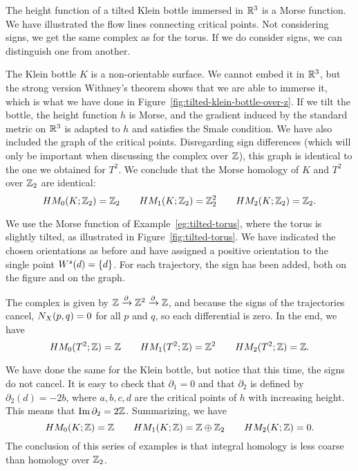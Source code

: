 \begin{eg}
    \begin{marginfigure}
        \centering
        \caption{The height function of a tilted Klein bottle immersed in $\R^3$ is a Morse function.
            We have illustrated the flow lines connecting critical points.
            Not considering signs, we get the same complex as for the torus. If we do consider signs, we can distinguish one from another.
        }
        \label{fig:tilted-klein-bottle-over-z}
    \end{marginfigure}
    The Klein bottle $K$ is a non-orientable surface. We cannot embed it in $\R^3$, but the strong version Withney's theorem shows that we are able to immerse it, which is what we have done in Figure~\ref{fig:tilted-klein-bottle-over-z}.
    If we tilt the bottle, the height function $h$ is Morse, and the gradient induced by the standard metric on $\R^3$ is adapted to $h$ and satisfies the Smale condition.
    We have also included the graph of the critical points.
    Disregarding sign differences (which will only be important when discussing the complex over $\Z$), this graph is identical to the one we obtained for $T^2$. We conclude that the Morse homology of $K$ and  $T^2$ over $\Z_2$ are identical:
    \[
        \HMf[0]{K; \Z_2} = \Z_2 \qquad
        \HMf[1]{K; \Z_2} = \Z_2^2 \qquad
        \HMf[2]{K; \Z_2} = \Z_2
    .\] 
\end{eg}

\begin{eg}
    We use the Morse function of Example~\ref{eg:tilted-torus}, where the torus is slightly tilted, as illustrated in Figure~\ref{fig:tilted-torus}.
    We have indicated the chosen orientations as before and have assigned a positive orientation to the single point $\stable d = \{d\}$.
    For each trajectory, the sign has been added, both on the figure and on the graph.

    The complex is given by $\Z \xrightarrow{\partial} \Z^2 \xrightarrow{\partial}  \Z$, and because the signs of the trajectories cancel, $\NX Xpq = 0$ for all $p$ and $q$, so each differential is zero.
    In the end, we have
    \[
        \HMf[0]{T^2; \Z} = \Z \qquad
        \HMf[1]{T^2; \Z} = \Z^2 \qquad
        \HMf[2]{T^2; \Z} = \Z
    .\] 
\end{eg}
\begin{eg}
    We have done the same for the Klein bottle, but notice that this time, the signs do not cancel.
    It is easy to check that $\partial_1 = 0$ and that  $\partial_2$ is defined by  $\partial_2(d) = -2b$, where $a,b,c,d$ are the critical points of $h$ with increasing height.
    This means that $\Im \partial_2 = 2 \Z$. Summarizing, we have
    \[
        \HMf[0]{K; \Z} = \Z \qquad
        \HMf[1]{K; \Z} = \Z \oplus \Z_2 \qquad
        \HMf[2]{K; \Z} = 0
    .\] 
    The conclusion of this series of examples is that integral homology is less coarse than homology over $\Z_2$.
\end{eg}

